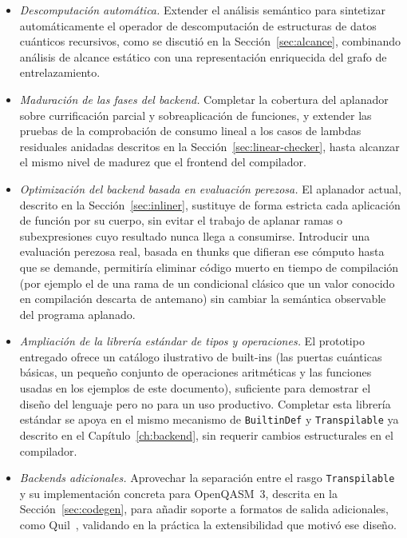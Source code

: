 \begin{itemize}
  \item \textit{Descomputación automática.} Extender el análisis semántico para sintetizar automáticamente el operador de descomputación de estructuras de datos cuánticos recursivos, como se discutió en la Sección~\ref{sec:alcance}, combinando análisis de alcance estático con una representación enriquecida del grafo de entrelazamiento.

  \item \textit{Maduración de las fases del backend.} Completar la cobertura del aplanador sobre currificación parcial y sobreaplicación de funciones, y extender las pruebas de la comprobación de consumo lineal a los casos de lambdas residuales anidadas descritos en la Sección~\ref{sec:linear-checker}, hasta alcanzar el mismo nivel de madurez que el frontend del compilador.

  \item \textit{Optimización del backend basada en evaluación perezosa.} El aplanador actual, descrito en la Sección~\ref{sec:inliner}, sustituye de forma estricta cada aplicación de función por su cuerpo, sin evitar el trabajo de aplanar ramas o subexpresiones cuyo resultado nunca llega a consumirse. Introducir una evaluación perezosa real, basada en thunks que difieran ese cómputo hasta que se demande, permitiría eliminar código muerto en tiempo de compilación (por ejemplo el de una rama de un condicional clásico que un valor conocido en compilación descarta de antemano) sin cambiar la semántica observable del programa aplanado.

  \item \textit{Ampliación de la librería estándar de tipos y operaciones.} El prototipo entregado ofrece un catálogo ilustrativo de built-ins (las puertas cuánticas básicas, un pequeño conjunto de operaciones aritméticas y las funciones usadas en los ejemplos de este documento), suficiente para demostrar el diseño del lenguaje pero no para un uso productivo. Completar esta librería estándar se apoya en el mismo mecanismo de \lstinline|BuiltinDef| y \lstinline|Transpilable| ya descrito en el Capítulo~\ref{ch:backend}, sin requerir cambios estructurales en el compilador.

  \item \textit{Backends adicionales.} Aprovechar la separación entre el rasgo \lstinline|Transpilable| y su implementación concreta para OpenQASM~3, descrita en la Sección~\ref{sec:codegen}, para añadir soporte a formatos de salida adicionales, como Quil~\cite{quil_2016}, validando en la práctica la extensibilidad que motivó ese diseño.


\end{itemize}
